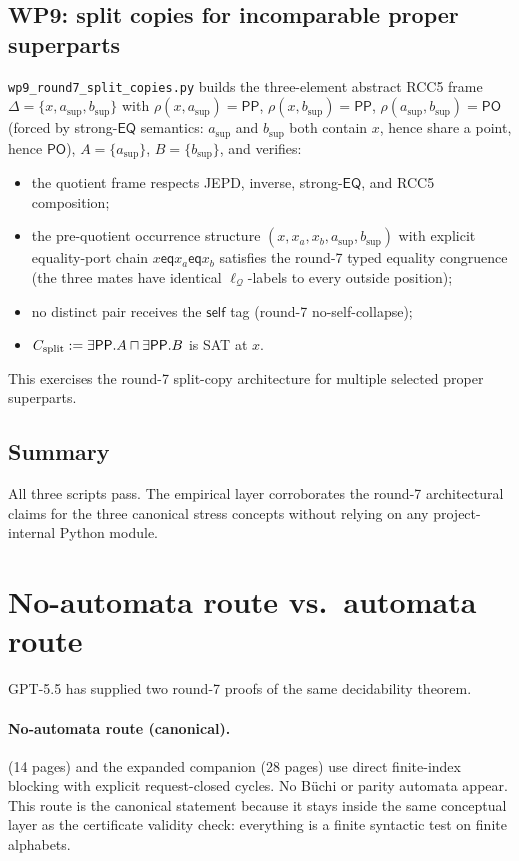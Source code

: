\documentclass[11pt]{article}
\theoremstyle{definition}
\theoremstyle{remark}
\newcommand{\PO}{\mathsf{PO}}
\newcommand{\PP}{\mathsf{PP}}
\newcommand{\EQ}{\mathsf{EQ}}
\newcommand{\Q}{\mathcal Q}
\newcommand{\self}{\mathsf{self}}
\newcommand{\eqtag}{\mathsf{eq}}
\begin{document}
\subsection{WP9: split copies for incomparable proper superparts}
\label{ssec:wp9}

\texttt{wp9\_round7\_split\_copies.py} builds the three-element
abstract RCC5 frame $\Delta=\{x,a_\text{sup},b_\text{sup}\}$ with
$\rho(x,a_\text{sup})=\PP$, $\rho(x,b_\text{sup})=\PP$,
$\rho(a_\text{sup},b_\text{sup})=\PO$ (forced by strong-$\EQ$
semantics: $a_\text{sup}$ and $b_\text{sup}$ both contain $x$, hence
share a point, hence $\PO$), $A=\{a_\text{sup}\}$, $B=\{b_\text{sup}\}$,
and verifies:
\begin{itemize}
\item the quotient frame respects JEPD, inverse, strong-$\EQ$, and
RCC5 composition;
\item the pre-quotient occurrence structure
$(x,x_a,x_b,a_\text{sup},b_\text{sup})$ with explicit equality-port
chain $x\eqtag x_a\eqtag x_b$ satisfies the round-7 typed equality
congruence (the three mates have identical $\ell_\Q$-labels to every
outside position);
\item no distinct pair receives the $\self$ tag (round-7
no-self-collapse);
\item $C_{\rm split}:=\exists\PP.A\sqcap\exists\PP.B$ is SAT at $x$.
\end{itemize}
This exercises the round-7 split-copy architecture for multiple
selected proper superparts.

\subsection{Summary}

All three scripts pass.  The empirical layer corroborates the
round-7 architectural claims for the three canonical stress concepts
without relying on any project-internal Python module.

\section{No-automata route vs.\ automata route}
\label{sec:two-routes}

GPT-5.5 has supplied two round-7 proofs of the same decidability
theorem.

\paragraph{No-automata route (canonical).}
\cite{GPT55Round7Sketch} (14 pages) and the expanded companion
\cite{GPT55Round7Expanded} (28 pages) use direct finite-index blocking
with explicit request-closed cycles.  No B\"uchi or parity automata
appear.  This route is the canonical statement because it stays inside
the same conceptual layer as the certificate validity check:
everything is a finite syntactic test on finite alphabets.
\end{document}
